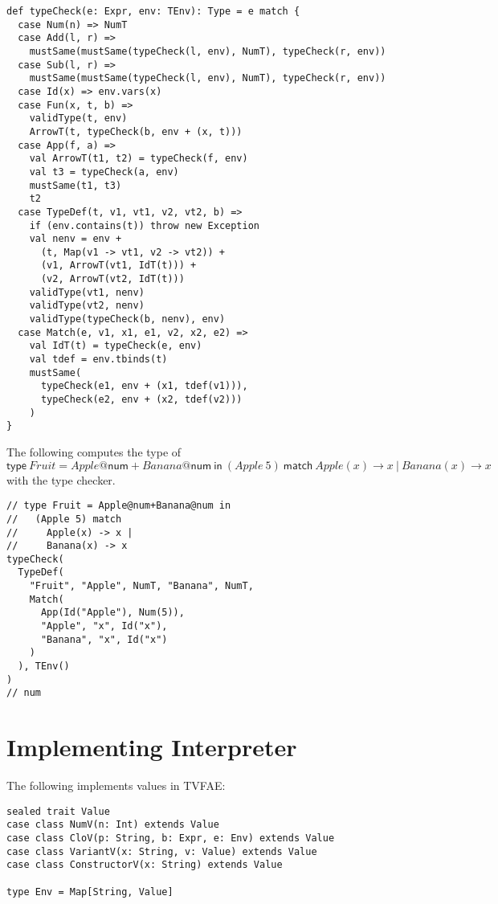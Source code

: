 \begin{verbatim}
def typeCheck(e: Expr, env: TEnv): Type = e match {
  case Num(n) => NumT
  case Add(l, r) =>
    mustSame(mustSame(typeCheck(l, env), NumT), typeCheck(r, env))
  case Sub(l, r) =>
    mustSame(mustSame(typeCheck(l, env), NumT), typeCheck(r, env))
  case Id(x) => env.vars(x)
  case Fun(x, t, b) =>
    validType(t, env)
    ArrowT(t, typeCheck(b, env + (x, t)))
  case App(f, a) =>
    val ArrowT(t1, t2) = typeCheck(f, env)
    val t3 = typeCheck(a, env)
    mustSame(t1, t3)
    t2
  case TypeDef(t, v1, vt1, v2, vt2, b) =>
    if (env.contains(t)) throw new Exception
    val nenv = env +
      (t, Map(v1 -> vt1, v2 -> vt2)) +
      (v1, ArrowT(vt1, IdT(t))) +
      (v2, ArrowT(vt2, IdT(t)))
    validType(vt1, nenv)
    validType(vt2, nenv)
    validType(typeCheck(b, nenv), env)
  case Match(e, v1, x1, e1, v2, x2, e2) =>
    val IdT(t) = typeCheck(e, env)
    val tdef = env.tbinds(t)
    mustSame(
      typeCheck(e1, env + (x1, tdef(v1))),
      typeCheck(e2, env + (x2, tdef(v2)))
    )
}
\end{verbatim}

The following computes the type of $\textsf{type}\
Fruit=Apple@\textsf{num}+Banana@\textsf{num}\ \textsf{in}\ (Apple\ 5)\
\textsf{match}\ Apple(x)\rightarrow x\ |\ Banana(x)\rightarrow x$ with the type
checker.

\begin{verbatim}
// type Fruit = Apple@num+Banana@num in
//   (Apple 5) match
//     Apple(x) -> x |
//     Banana(x) -> x
typeCheck(
  TypeDef(
    "Fruit", "Apple", NumT, "Banana", NumT,
    Match(
      App(Id("Apple"), Num(5)),
      "Apple", "x", Id("x"),
      "Banana", "x", Id("x")
    )
  ), TEnv()
)
// num
\end{verbatim}

\section{Implementing Interpreter}

The following implements values in TVFAE:

\begin{verbatim}
sealed trait Value
case class NumV(n: Int) extends Value
case class CloV(p: String, b: Expr, e: Env) extends Value
case class VariantV(x: String, v: Value) extends Value
case class ConstructorV(x: String) extends Value

type Env = Map[String, Value]
\end{verbatim}

